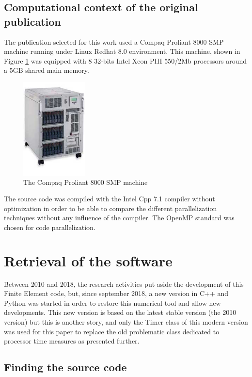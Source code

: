 \subsection{Computational context of the original publication}
The publication selected for this work \cite{Pantale:2005} used a Compaq Proliant 8000 SMP machine running under Linux Redhat 8.0 environment. This machine, shown in Figure \ref{proliant} was equipped with 8 32-bits Intel Xeon PIII 550/2Mb processors around a 5GB shared main memory. 
\begin{figure}[h] 
  \centering
  \includegraphics[width=0.3\textwidth]{./8000_photo.jpg}
  \caption{The Compaq Proliant 8000 SMP machine}
  \label{proliant}
\end{figure}
The source code was compiled with the Intel Cpp 7.1 compiler without optimization in order to be able to compare the different parallelization techniques without any influence of the compiler. The OpenMP standard was chosen for code parallelization.

\section{Retrieval of the software}

Between 2010 and 2018, the research activities put aside the development of this Finite Element code, but, since september 2018, a new version in C++ and Python was started in order to restore this numerical tool and allow new developments. This new version is based on the latest stable version (the 2010 version) but this is another story, and only the Timer class of this modern version was used for this paper to replace the old problematic class dedicated to processor time measures as presented further.

\subsection{Finding the source code}

